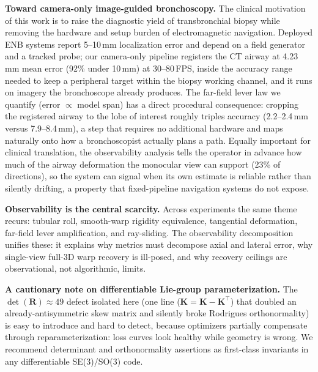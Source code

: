 \documentclass[9pt,twoside,web]{ieeecolor2}
\begin{document}
\textbf{Toward camera-only image-guided bronchoscopy.} The clinical motivation of this work is to raise the diagnostic yield of transbronchial biopsy while removing the hardware and setup burden of electromagnetic navigation. Deployed ENB systems report 5--10\,mm localization error and depend on a field generator and a tracked probe; our camera-only pipeline registers the CT airway at 4.23\,mm mean error (92\% under 10\,mm) at 30--80\,FPS, inside the accuracy range needed to keep a peripheral target within the biopsy working channel, and it runs on imagery the bronchoscope already produces. The far-field lever law we quantify (error $\propto$ model span) has a direct procedural consequence: cropping the registered airway to the lobe of interest roughly triples accuracy (2.2--2.4\,mm versus 7.9--8.4\,mm), a step that requires no additional hardware and maps naturally onto how a bronchoscopist actually plans a path. Equally important for clinical translation, the observability analysis tells the operator in advance how much of the airway deformation the monocular view can support (23\% of directions), so the system can signal when its own estimate is reliable rather than silently drifting, a property that fixed-pipeline navigation systems do not expose.

\textbf{Observability is the central scarcity.} Across experiments the same theme recurs: tubular roll, smooth-warp rigidity equivalence, tangential deformation, far-field lever amplification, and ray-sliding. The observability decomposition unifies these: it explains why metrics must decompose axial and lateral error, why single-view full-3D warp recovery is ill-posed, and why recovery ceilings are observational, not algorithmic, limits.

\textbf{A cautionary note on differentiable Lie-group parameterization.} The $\det(\mathbf{R})\approx49$ defect isolated here (one line ($\mathbf{K}=\mathbf{K}-\mathbf{K}^{\top}$) that doubled an already-antisymmetric skew matrix and silently broke Rodrigues orthonormality) is easy to introduce and hard to detect, because optimizers partially compensate through reparameterization: loss curves look healthy while geometry is wrong. We recommend determinant and orthonormality assertions as first-class invariants in any differentiable SE(3)/SO(3) code.
\end{document}
